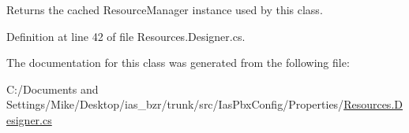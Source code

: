 Returns the cached ResourceManager instance used by this class. 

Definition at line 42 of file Resources.Designer.cs.

The documentation for this class was generated from the following file:\begin{DoxyCompactItemize}
\item 
C:/Documents and Settings/Mike/Desktop/ias\_\-bzr/trunk/src/IasPbxConfig/Properties/\hyperlink{_resources_8_designer_8cs}{Resources.Designer.cs}\end{DoxyCompactItemize}
